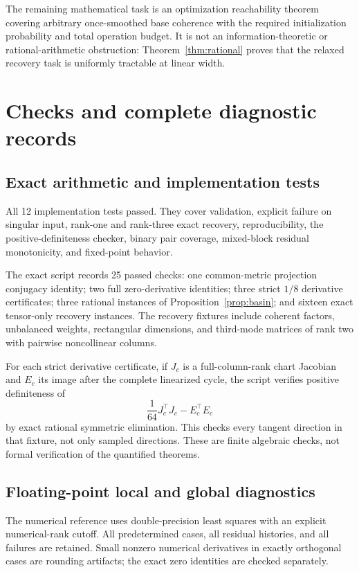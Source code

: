 \documentclass[11pt]{article}
\theoremstyle{remark}\newtheorem{remark}[theorem]{Remark}
\begin{document}
The remaining mathematical task is an optimization reachability theorem covering arbitrary once-smoothed base coherence with the required initialization probability and total operation budget. It is not an information-theoretic or rational-arithmetic obstruction: Theorem~\ref{thm:rational} proves that the relaxed recovery task is uniformly tractable at linear width.

\section{Checks and complete diagnostic records}
\subsection{Exact arithmetic and implementation tests}
All 12 implementation tests passed. They cover validation, explicit failure on singular input, rank-one and rank-three exact recovery, reproducibility, the positive-definiteness checker, binary pair coverage, mixed-block residual monotonicity, and fixed-point behavior.

The exact script records 25 passed checks: one common-metric projection conjugacy identity; two full zero-derivative identities; three strict $1/8$ derivative certificates; three rational instances of Proposition~\ref{prop:basin}; and sixteen exact tensor-only recovery instances. The recovery fixtures include coherent factors, unbalanced weights, rectangular dimensions, and third-mode matrices of rank two with pairwise noncollinear columns.

For each strict derivative certificate, if $J_c$ is a full-column-rank chart Jacobian and $E_c$ its image after the complete linearized cycle, the script verifies positive definiteness of
\[
 \frac{1}{64}J_c^\top J_c-E_c^\top E_c
\]
by exact rational symmetric elimination. This checks every tangent direction in that fixture, not only sampled directions. These are finite algebraic checks, not formal verification of the quantified theorems.

\subsection{Floating-point local and global diagnostics}
The numerical reference uses double-precision least squares with an explicit numerical-rank cutoff. All predetermined cases, all residual histories, and all failures are retained. Small nonzero numerical derivatives in exactly orthogonal cases are rounding artifacts; the exact zero identities are checked separately.
\end{document}
